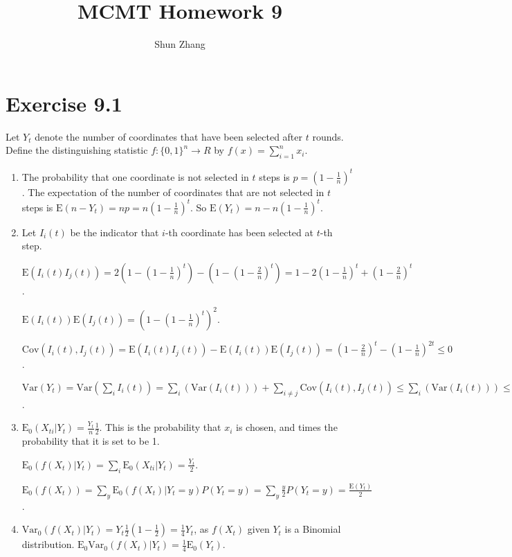 \documentclass[10pt]{article}
\title{MCMT Homework 9}
\author{Shun Zhang}
\date{}
\newcommand{\Cov}{\mathrm{Cov}}
\newcommand{\E}{\mathrm{E}}
\newcommand{\Var}{\mathrm{Var}}
\begin{document}
\maketitle

\section*{Exercise 9.1}

Let $Y_t$ denote the number of coordinates that have been selected after $t$ rounds.
Define the distinguishing statistic $f:\{0,1\}^n \rightarrow R$ by
$f(x)=\sum_{i=1}^n x_i$.

\begin{enumerate}

\item The probability that one coordinate is not selected in $t$ steps is $p = (1 -
\frac{1}{n})^t$. The expectation of the number of coordinates that are not
selected in $t$ steps is $\E(n - Y_t) = np = n(1 - \frac{1}{n})^t$. So $\E(Y_t) =
n - n(1 - \frac{1}{n})^t$.

\item Let $I_i(t)$ be the indicator that $i$-th coordinate has been selected at
$t$-th step.

$\E(I_i(t) I_j(t)) = 2(1 - (1 - \frac{1}{n})^t) - (1 - (1 - \frac{2}{n})^t) = 1
- 2(1 - \frac{1}{n})^t + (1 - \frac{2}{n})^t$.

$\E(I_i(t))\E(I_j(t)) = (1 - (1 - \frac{1}{n})^t)^2$.

$\Cov(I_i(t), I_j(t)) = \E(I_i(t) I_j(t)) - \E(I_i(t))\E(I_j(t)) = (1 -
\frac{2}{n})^t - (1 - \frac{1}{n})^{2t} \leq 0$.

$\Var(Y_t) = \Var(\sum_i I_i(t)) = \sum_i(\Var (I_i(t))) + \sum_{i \neq
j}\Cov(I_i(t), I_j(t)) \leq \sum_i(\Var (I_i(t))) \leq n p(1-p) \leq \frac{n}{4}$.

\item $\E_0(X_{ti} | Y_t) = \frac{Y_t}{n} \frac{1}{2}$. This is the probability
that $x_i$ is chosen, and times the probability that it is set to be 1.

$\E_0(f(X_t) | Y_t) = \sum_i \E_0(X_{ti} | Y_t) = \frac{Y_t}{2}$.

$\E_0(f(X_t)) = \sum_y \E_0(f(X_t) | Y_t = y) P(Y_t = y) = \sum_y \frac{y}{2}
P(Y_t = y) = \frac{\E(Y_t)}{2}$.

\item
$\Var_0(f(X_t) | Y_t) = Y_t \frac{1}{2} (1 - \frac{1}{2}) = \frac{1}{4} Y_t$, as
$f(X_t)$ given $Y_t$ is a Binomial distribution.
$\E_0 \Var_0(f(X_t) | Y_t) = \frac{1}{4} \E_0(Y_t)$.


\end{enumerate}
\end{document}
